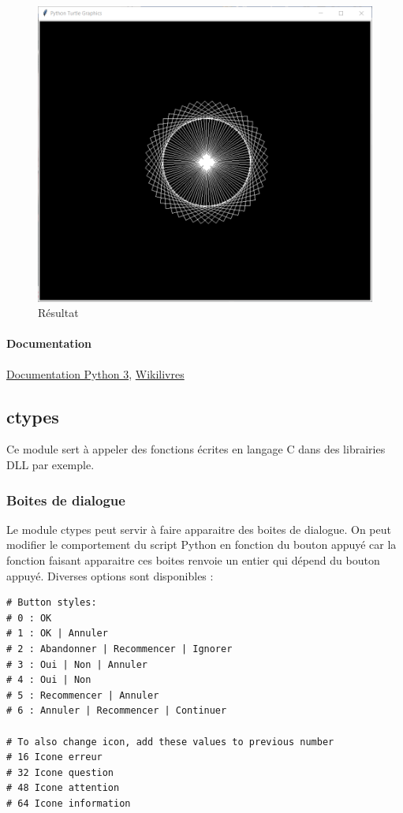 \documentclass[a4paper, 10pt]{article}
\begin{document}
\begin{figure}[h]
\begin{center}
\includegraphics[scale=0.5]{turtle.png}
\caption*{Résultat}
\end{center}
\end{figure}

\paragraph{Documentation} \href{https://docs.python.org/fr/3.6/library/turtle.html#methods-specific-to-screen-not-inherited-from-turtlescreen}{Documentation Python 3}, \href{https://fr.wikibooks.org/wiki/Programmation_Python/Turtle}{Wikilivres}

\subsection{ctypes}
 Ce module sert à appeler des fonctions écrites en langage C dans des librairies DLL par exemple.
\subsubsection{Boites de dialogue}
 Le module ctypes peut servir à faire apparaitre des boites de dialogue. On peut modifier le comportement du script Python en fonction du bouton appuyé car la fonction faisant apparaitre ces boites renvoie un entier qui dépend du bouton appuyé. Diverses options sont disponibles :
\begin{verbatim}
# Button styles:
# 0 : OK
# 1 : OK | Annuler
# 2 : Abandonner | Recommencer | Ignorer
# 3 : Oui | Non | Annuler
# 4 : Oui | Non
# 5 : Recommencer | Annuler
# 6 : Annuler | Recommencer | Continuer

# To also change icon, add these values to previous number
# 16 Icone erreur
# 32 Icone question
# 48 Icone attention
# 64 Icone information
\end{verbatim}
\end{document}
